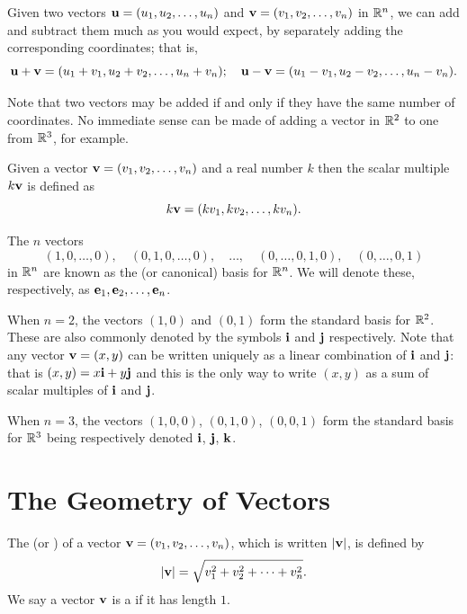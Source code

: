 Given two vectors $\vb{u}=(u_1,u_2,\dots,u_n)$ and $\vb{v}=(v_1,v_2,\dots,v_n)$ in $\mathbb R^n$, we can add and subtract them much as you would expect, by separately adding the corresponding coordinates; that is, 
\[ \vb{u}+\vb{v}=(u_1+v_1,u_2+v_2,\dots,u_n+v_n); \quad \vb{u}-\vb{v}=(u_1-v_1,u_2-v_2,\dots,u_n-v_n). \]

\begin{remark}
Note that two vectors may be added if and only if they have the same number of coordinates. No immediate sense can be made of adding a vector in $\mathbb R^2$ to one from $\mathbb R^3$, for example.
\end{remark}

Given a vector $\vb{v}=(v_1,v_2,\dots,v_n)$ and a real number $k$ then the scalar multiple $k\vb{v}$ is defined as
\[ k\vb{v}=(kv_1,kv_2,\dots,kv_n). \]

\begin{definition}
The $n$ vectors
\[ (1,0,\dots,0), \quad (0,1,0,\dots,0), \quad \dots, \quad (0,\dots,0,1,0), \quad (0,\dots,0,1) \]
in $\mathbb R^n$ are known as the  (or canonical) basis for $\mathbb R^n$. We will denote these, respectively, as $\vb{e}_1,\vb{e}_2,\dots,\vb{e}_n$.
\end{definition}

\begin{notation}
When $n=2$, the vectors $(1,0)$ and $(0,1)$ form the standard basis for $\mathbb R^2$. These are also commonly denoted by the symbols $\vb{i}$ and $\vb{j}$ respectively. Note that any vector $\vb{v}=(x,y)$ can be written uniquely as a linear combination of $\vb{i}$ and $\vb{j}$: that is $(x,y)=x\vb{i}+y\vb{j}$ and this is the only way to write $(x,y)$ as a sum of scalar multiples of $\vb{i}$ and $\vb{j}$.

When $n=3$, the vectors $(1,0,0)$, $(0,1,0)$, $(0,0,1)$ form the standard basis for $\mathbb R^3$ being respectively denoted $\vb{i}$, $\vb{j}$, $\vb{k}$.
\end{notation}

\section{The Geometry of Vectors}
\begin{definition}
The  (or ) of a vector $\vb{v}=(v_1,v_2,\dots,v_n)$, which is written $|\vb{v}|$, is defined by
\[ |\vb{v}|=\sqrt{v_1^2+v_2^2+\cdots+v_n^2}. \]
We say a vector $\vb{v}$ is a  if it has length $1$.
\end{definition}


